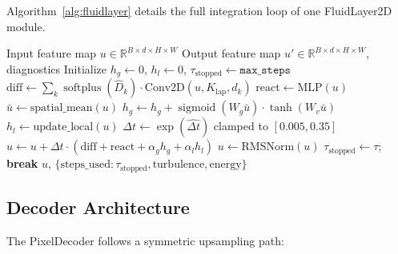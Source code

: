 \documentclass{article}
\newcommand{\R}{\mathbb{R}}
\DeclareMathOperator{\softplus}{softplus}
\DeclareMathOperator{\sigmoid}{sigmoid}
\begin{document}
Algorithm~\ref{alg:fluidlayer} details the full integration loop of one FluidLayer2D module.

\begin{algorithm}[h]
\caption{FluidLayer2D Forward Pass}
\label{alg:fluidlayer}
\begin{algorithmic}[1]
\REQUIRE Input feature map $u \in \R^{B \times d \times H \times W}$
\ENSURE Output feature map $u' \in \R^{B \times d \times H \times W}$, diagnostics
\STATE Initialize $h_g \leftarrow 0$, $h_l \leftarrow 0$, $\tau_{\text{stopped}} \leftarrow \texttt{max\_steps}$
    \STATE $\text{diff} \leftarrow \sum_k \softplus(\hat{D}_k) \cdot \text{Conv2D}(u, K_{\text{lap}}, d_k)$ 
    \STATE $\text{react} \leftarrow \text{MLP}(u)$ 
    \STATE $\bar{u} \leftarrow \text{spatial\_mean}(u)$
    \STATE $h_g \leftarrow h_g + \sigmoid(W_g \bar{u}) \cdot \tanh(W_v \bar{u})$ 
    \STATE $h_l \leftarrow \text{update\_local}(u)$ 
    \STATE $\Delta t \leftarrow \exp(\widehat{\Delta t})$ clamped to $[0.005, 0.35]$
    \STATE $u \leftarrow u + \Delta t \cdot (\text{diff} + \text{react} + \alpha_g h_g + \alpha_l h_l)$
        \STATE $u \leftarrow \text{RMSNorm}(u)$
    \ENDIF
        \STATE $\tau_{\text{stopped}} \leftarrow \tau$; \textbf{break}
    \ENDIF
\ENDFOR
\RETURN $u$, $\{\text{steps\_used}: \tau_{\text{stopped}}, \text{turbulence}, \text{energy}\}$
\end{algorithmic}
\end{algorithm}

\subsection{Decoder Architecture}

The PixelDecoder follows a symmetric upsampling path:
\end{document}
